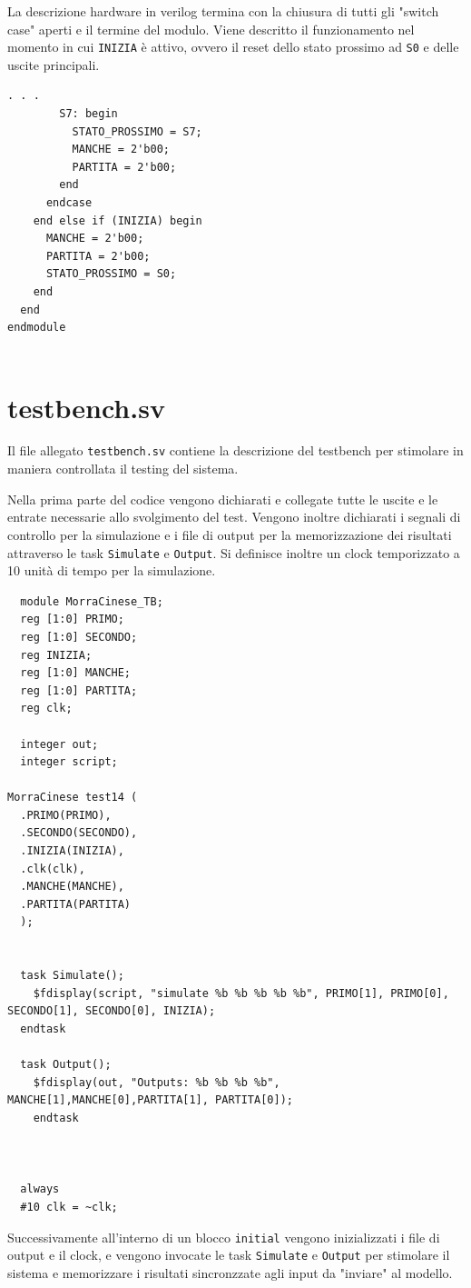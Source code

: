 \documentclass[a4paper]{report}
\begin{document}
La descrizione hardware in verilog termina con la chiusura di tutti gli "switch case" aperti e il termine del modulo.
Viene descritto il funzionamento nel momento in cui \texttt{INIZIA} è attivo, ovvero il reset dello stato prossimo ad \texttt{S0} e delle uscite principali. 
\begin{lstlisting}[firstnumber=348]
        . . .
        S7: begin
          STATO_PROSSIMO = S7;
          MANCHE = 2'b00;
          PARTITA = 2'b00;
        end
      endcase
    end else if (INIZIA) begin
      MANCHE = 2'b00;
      PARTITA = 2'b00;
      STATO_PROSSIMO = S0;
    end
  end
endmodule


\end{lstlisting}

\section{testbench.sv}

Il file allegato \texttt{testbench.sv} contiene la descrizione del testbench per stimolare in maniera controllata il testing del sistema.

Nella prima parte del codice vengono dichiarati e collegate tutte le uscite e le entrate necessarie allo svolgimento del test. 
Vengono inoltre dichiarati i segnali di controllo per la simulazione e i file di output per la memorizzazione dei risultati attraverso le task \texttt{Simulate} e \texttt{Output}.
Si definisce inoltre un clock temporizzato a 10 unità di tempo per la simulazione.
\begin{lstlisting}
  module MorraCinese_TB;
  reg [1:0] PRIMO;
  reg [1:0] SECONDO;
  reg INIZIA;
  reg [1:0] MANCHE;
  reg [1:0] PARTITA;
  reg clk;

  integer out;
  integer script;

MorraCinese test14 (
  .PRIMO(PRIMO),
  .SECONDO(SECONDO),
  .INIZIA(INIZIA),
  .clk(clk),
  .MANCHE(MANCHE),
  .PARTITA(PARTITA)
  );
  

  task Simulate();
    $fdisplay(script, "simulate %b %b %b %b %b", PRIMO[1], PRIMO[0], SECONDO[1], SECONDO[0], INIZIA);
  endtask

  task Output();   
    $fdisplay(out, "Outputs: %b %b %b %b", MANCHE[1],MANCHE[0],PARTITA[1], PARTITA[0]);
    endtask



  always
  #10 clk = ~clk;
\end{lstlisting}

Successivamente all'interno di un blocco \texttt{initial} vengono inizializzati i file di output e il clock, e vengono invocate le task \texttt{Simulate} e \texttt{Output} per stimolare il sistema e memorizzare i risultati sincronzzate agli input da "inviare" al modello.
\end{document}
